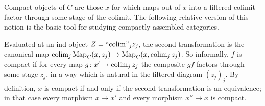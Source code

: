 	Compact objects of $C$ are those $x$ for which maps out of $x$ into a filtered colimit factor through some stage of the colimit. The following relative version of this notion is the basic tool for studying compactly assembled categories.


	Evaluated at an ind-object $Z = \text{``}\!\operatorname{colim}\!\text{''}_j z_j$, the second transformation is the canonical map $\operatorname{colim}_j \operatorname{Map}_C(x,z_j) \to \operatorname{Map}_C(x,\operatorname{colim}_j z_j)$. So informally, $f$ is compact if for every map $g\colon x' \to \operatorname{colim}_j z_j$ the composite $gf$ factors through some stage $z_j$, in a way which is natural in the filtered diagram $(z_j)_j$. By definition, $x$ is compact if and only if the second transformation is an equivalence; in that case every morphism $x \to x'$ and every morphism $x'' \to x$ is compact.


